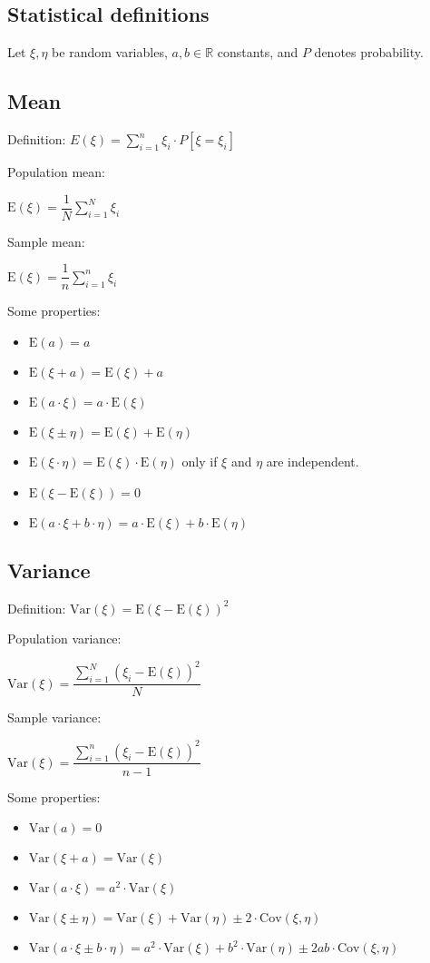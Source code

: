 \documentclass[10pt, a4paper, landscape]{extarticle}
\newcommand{\E}{\mathrm{E}}
\newcommand{\Var}{\mathrm{Var}}
\newcommand{\Cov}{\mathrm{Cov}}
\begin{document}
\begin{multicols}{3}
\section*{Statistical definitions}
	Let $\xi, \eta$ be random variables, $a, b \in \mathbb{R}$ constants, and $P$ denotes probability.
	\subsection*{Mean}
	Definition: \quad $E(\xi) = \sum_{i=1}^{n} \xi_i \cdot P[\xi = \xi_i]$
	\begin{multicols}{2}
		Population mean:
		\begin{center}
			$\E(\xi) = \dfrac{1}{N} \sum_{i=1}^{N} \xi_i$
		\end{center}
		\columnbreak
		Sample mean:
		\begin{center}
			$\E(\xi) = \dfrac{1}{n} \sum_{i=1}^{n} \xi_i$
		\end{center}
	\end{multicols}
	Some properties:
	\begin{itemize}[leftmargin=*]
		\item $\E(a) = a$
		\item $\E(\xi + a) = \E(\xi) + a$
		\item $\E(a \cdot \xi) = a \cdot \E(\xi)$
		\item $\E(\xi \pm \eta) = \E(\xi) + \E(\eta)$
		\item $\E(\xi \cdot \eta) = \E(\xi) \cdot \E(\eta)$ \quad only if $\xi$ and $\eta$ are independent.
		\item $\E(\xi - \E(\xi)) = 0$
		\item $\E(a \cdot \xi + b \cdot \eta) = a \cdot \E(\xi) + b \cdot \E(\eta)$
	\end{itemize}
	\subsection*{Variance}
	Definition: \quad $\Var(\xi) = \E(\xi - \E(\xi))^2$
	\begin{multicols}{2}
		Population variance:
		\begin{center}
			$\Var(\xi) = \dfrac{\sum_{i=1}^{N} (\xi_i - \E(\xi))^2}{N}$
		\end{center}
		\columnbreak
		Sample variance:
		\begin{center}
			$\Var(\xi) = \dfrac{\sum_{i=1}^{n} (\xi_i - \E(\xi))^2}{n-1}$
		\end{center}
	\end{multicols}
	Some properties:
	\begin{itemize}[leftmargin=*]
		\item $\Var(a) = 0$
		\item $\Var(\xi + a) = \Var(\xi)$
		\item $\Var(a \cdot \xi) = a^2 \cdot \Var(\xi)$
		\item $\Var(\xi \pm \eta) = \Var(\xi) + \Var(\eta) \pm 2 \cdot \Cov(\xi, \eta)$
		\item $\Var(a \cdot \xi \pm b \cdot \eta) = a^2 \cdot \Var(\xi) + b^2 \cdot \Var(\eta) \pm 2 a b \cdot \Cov(\xi, \eta)$
	\end{itemize}

\end{multicols}
\end{document}
